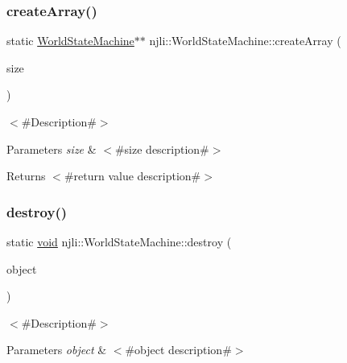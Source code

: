 \subsubsection{\texorpdfstring{create\+Array()}{createArray()}}
{\footnotesize\ttfamily static \mbox{\hyperlink{classnjli_1_1_world_state_machine}{World\+State\+Machine}}$\ast$$\ast$ njli\+::\+World\+State\+Machine\+::create\+Array (\begin{DoxyParamCaption}\item[{const \mbox{\hyperlink{_util_8h_a10e94b422ef0c20dcdec20d31a1f5049}{u32}}}]{size }\end{DoxyParamCaption})\hspace{0.3cm}{\ttfamily [static]}}

$<$\#\+Description\#$>$


\begin{DoxyParams}{Parameters}
{\em size} & $<$\#size description\#$>$\\
\hline
\end{DoxyParams}
\begin{DoxyReturn}{Returns}
$<$\#return value description\#$>$ 
\end{DoxyReturn}
\mbox{\label{classnjli_1_1_world_state_machine_ab9dd49b28f0217cb0d67f30b88c692e6}} 
\subsubsection{\texorpdfstring{destroy()}{destroy()}}
{\footnotesize\ttfamily static \mbox{\hyperlink{_thread_8h_af1e856da2e658414cb2456cb6f7ebc66}{void}} njli\+::\+World\+State\+Machine\+::destroy (\begin{DoxyParamCaption}\item[{\mbox{\hyperlink{classnjli_1_1_world_state_machine}{World\+State\+Machine}} $\ast$}]{object }\end{DoxyParamCaption})\hspace{0.3cm}{\ttfamily [static]}}

$<$\#\+Description\#$>$


\begin{DoxyParams}{Parameters}
{\em object} & $<$\#object description\#$>$ \\
\hline
\end{DoxyParams}
\mbox{\label{classnjli_1_1_world_state_machine_a45ee6a98dd7369769fede029d6e09e96}} 

